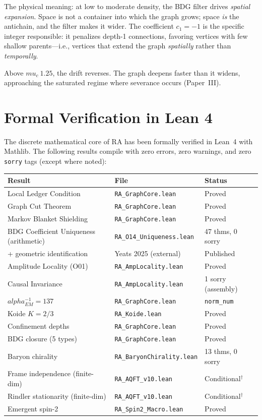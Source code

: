\documentclass[11pt]{article}
\def\mu{mu}%
\def\alpha{alpha}%
\def\mathrm#1{#1}%
\def\approx{~}%
\begin{document}
The physical meaning: at low to moderate density, the BDG filter drives \emph{spatial expansion}. Space is not a container into which the graph grows; space \emph{is} the antichain, and the filter makes it wider. The coefficient $c_1=-1$ is the specific integer responsible: it penalizes depth-1 connections, favoring vertices with few shallow parents---i.e., vertices that extend the graph \emph{spatially} rather than \emph{temporally}.

Above $\mu_c\approx 1.25$, the drift reverses. The graph deepens faster than it widens, approaching the saturated regime where severance occurs (Paper~III).

\section{Formal Verification in Lean 4}
\label{sec:lean}

The discrete mathematical core of RA has been formally verified in Lean~4 with Mathlib. The following results compile with zero errors, zero warnings, and zero \texttt{sorry} tags (except where noted):

\begin{center}
\begin{tabular}{lll}
\toprule
Result & File & Status \\
\midrule
Local Ledger Condition & \texttt{RA\_GraphCore.lean} & Proved \\
Graph Cut Theorem & \texttt{RA\_GraphCore.lean} & Proved \\
Markov Blanket Shielding & \texttt{RA\_GraphCore.lean} & Proved \\
BDG Coefficient Uniqueness (arithmetic) & \texttt{RA\_O14\_Uniqueness.lean} & 47 thms, 0 sorry \\
\quad + geometric identification & Yeats 2025 (external) & Published \\
Amplitude Locality (O01) & \texttt{RA\_AmpLocality.lean} & Proved \\
Causal Invariance & \texttt{RA\_AmpLocality.lean} & 1 sorry (assembly) \\
$\alpha_{\mathrm{EM}}^{-1}=137$ & \texttt{RA\_GraphCore.lean} & \texttt{norm\_num} \\
Koide $K=2/3$ & \texttt{RA\_Koide.lean} & Proved \\
Confinement depths & \texttt{RA\_GraphCore.lean} & Proved \\
BDG closure (5 types) & \texttt{RA\_GraphCore.lean} & Proved \\
Baryon chirality & \texttt{RA\_BaryonChirality.lean} & 13 thms, 0 sorry \\
Frame independence (finite-dim) & \texttt{RA\_AQFT\_v10.lean} & Conditional$^\dagger$ \\
Rindler stationarity (finite-dim) & \texttt{RA\_AQFT\_v10.lean} & Conditional$^\dagger$ \\
Emergent spin-2 & \texttt{RA\_Spin2\_Macro.lean} & Proved \\
\bottomrule
\end{tabular}
\end{center}
\end{document}

